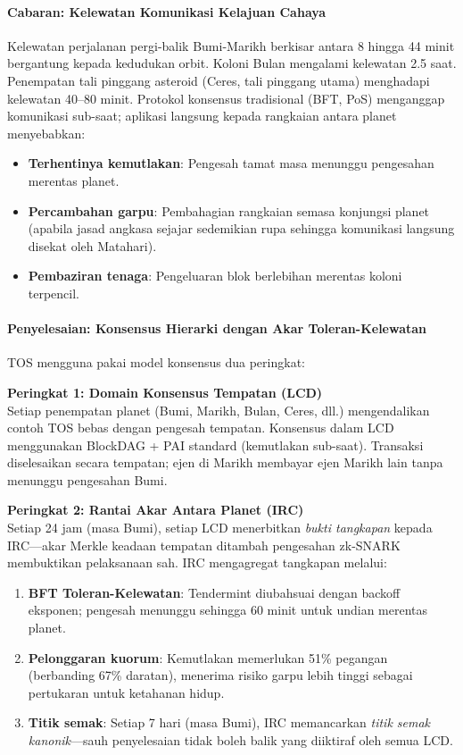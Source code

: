 \documentclass[11pt]{article}
\begin{document}
\paragraph{Cabaran: Kelewatan Komunikasi Kelajuan Cahaya}
Kelewatan perjalanan pergi-balik Bumi-Marikh berkisar antara 8 hingga 44 minit bergantung kepada kedudukan orbit. Koloni Bulan mengalami kelewatan 2.5 saat. Penempatan tali pinggang asteroid (Ceres, tali pinggang utama) menghadapi kelewatan 40--80 minit. Protokol konsensus tradisional (BFT, PoS) menganggap komunikasi sub-saat; aplikasi langsung kepada rangkaian antara planet menyebabkan:
\begin{itemize}[noitemsep]
  \item \textbf{Terhentinya kemutlakan}: Pengesah tamat masa menunggu pengesahan merentas planet.
  \item \textbf{Percambahan garpu}: Pembahagian rangkaian semasa konjungsi planet (apabila jasad angkasa sejajar sedemikian rupa sehingga komunikasi langsung disekat oleh Matahari).
  \item \textbf{Pembaziran tenaga}: Pengeluaran blok berlebihan merentas koloni terpencil.
\end{itemize}

\paragraph{Penyelesaian: Konsensus Hierarki dengan Akar Toleran-Kelewatan}
TOS mengguna pakai model konsensus dua peringkat:

\textbf{Peringkat 1: Domain Konsensus Tempatan (LCD)}\\
Setiap penempatan planet (Bumi, Marikh, Bulan, Ceres, dll.) mengendalikan contoh TOS bebas dengan pengesah tempatan. Konsensus dalam LCD menggunakan BlockDAG + PAI standard (kemutlakan sub-saat). Transaksi diselesaikan secara tempatan; ejen di Marikh membayar ejen Marikh lain tanpa menunggu pengesahan Bumi.

\textbf{Peringkat 2: Rantai Akar Antara Planet (IRC)}\\
Setiap 24 jam (masa Bumi), setiap LCD menerbitkan \emph{bukti tangkapan} kepada IRC—akar Merkle keadaan tempatan ditambah pengesahan zk-SNARK membuktikan pelaksanaan sah. IRC mengagregat tangkapan melalui:
\begin{enumerate}[noitemsep]
  \item \textbf{BFT Toleran-Kelewatan}: Tendermint diubahsuai dengan backoff eksponen; pengesah menunggu sehingga 60 minit untuk undian merentas planet.
  \item \textbf{Pelonggaran kuorum}: Kemutlakan memerlukan 51\% pegangan (berbanding 67\% daratan), menerima risiko garpu lebih tinggi sebagai pertukaran untuk ketahanan hidup.
  \item \textbf{Titik semak}: Setiap 7 hari (masa Bumi), IRC memancarkan \emph{titik semak kanonik}—sauh penyelesaian tidak boleh balik yang diiktiraf oleh semua LCD.
\end{enumerate}
\end{document}
